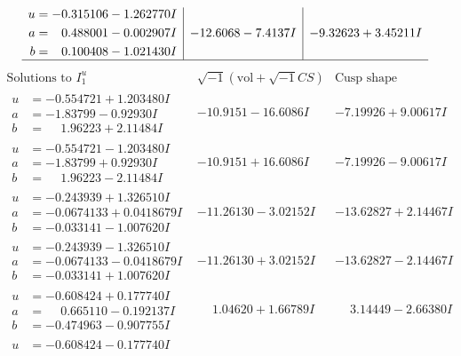 \documentclass[1p]{elsarticle_modified}
\theoremstyle{definition}
\newcommand{\I}{\sqrt{-1}}
\begin{document}
$$\begin{array}{c|c|c}
\begin{aligned}
u &= -0.315106 - 1.262770 I \\
a &= \phantom{-}0.488001 - 0.002907 I \\
b &= \phantom{-}0.100408 - 1.021430 I\end{aligned}
 & -12.6068 - 7.4137 I & -9.32623 + 3.45211 I\\
 \hline 
 \end{array}$$\newpage$$\begin{array}{c|c|c}  
\text{Solutions to }I^u_{1}& \I (\text{vol} + \sqrt{-1}CS) & \text{Cusp shape}\\
 \hline 
\begin{aligned}
u &= -0.554721 + 1.203480 I \\
a &= -1.83799 - 0.92930 I \\
b &= \phantom{-}1.96223 + 2.11484 I\end{aligned}
 & -10.9151 - 16.6086 I & -7.19926 + 9.00617 I \\ \hline\begin{aligned}
u &= -0.554721 - 1.203480 I \\
a &= -1.83799 + 0.92930 I \\
b &= \phantom{-}1.96223 - 2.11484 I\end{aligned}
 & -10.9151 + 16.6086 I & -7.19926 - 9.00617 I \\ \hline\begin{aligned}
u &= -0.243939 + 1.326510 I \\
a &= -0.0674133 + 0.0418679 I \\
b &= -0.033141 - 1.007620 I\end{aligned}
 & -11.26130 - 3.02152 I & -13.62827 + 2.14467 I \\ \hline\begin{aligned}
u &= -0.243939 - 1.326510 I \\
a &= -0.0674133 - 0.0418679 I \\
b &= -0.033141 + 1.007620 I\end{aligned}
 & -11.26130 + 3.02152 I & -13.62827 - 2.14467 I \\ \hline\begin{aligned}
u &= -0.608424 + 0.177740 I \\
a &= \phantom{-}0.665110 - 0.192137 I \\
b &= -0.474963 - 0.907755 I\end{aligned}
 & \phantom{-}1.04620 + 1.66789 I & \phantom{-}3.14449 - 2.66380 I \\ \hline\begin{aligned}
u &= -0.608424 - 0.177740 I \\

\end{aligned}
\end{array}$$
\end{document}
